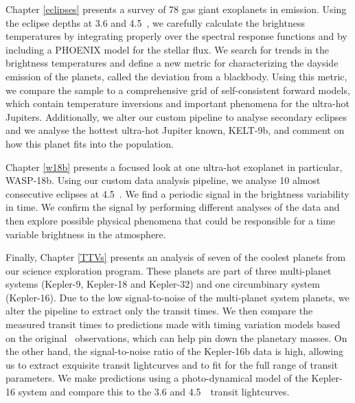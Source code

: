 Chapter \ref{eclipses} presents a survey of 78 gas giant exoplanets in emission. Using the eclipse depths at 3.6 and 4.5~\um, we carefully calculate the brightness temperatures by integrating properly over the \spitzer spectral response functions and by including a PHOENIX model for the stellar flux. We search for trends in the brightness temperatures and define a new metric for characterizing the dayside emission of the planets, called the deviation from a blackbody. Using this metric, we compare the sample to a comprehensive grid of self-consistent forward models, which contain temperature inversions and important phenomena for the ultra-hot Jupiters. Additionally, we alter our custom pipeline to analyse secondary eclipses and we analyse the hottest ultra-hot Jupiter known, KELT-9b, and comment on how this planet fits into the population.

Chapter \ref{w18b} presents a focused look at one ultra-hot exoplanet in particular, WASP-18b. Using our custom data analysis pipeline, we analyse 10 almost consecutive eclipses at 4.5~\um. We find a periodic signal in the brightness variability in time. We confirm the signal by performing different analyses of the data and then explore possible physical phenomena that could be responsible for a time variable brightness in the atmosphere.

Finally, Chapter \ref{TTVs} presents an analysis of seven of the coolest planets from our science exploration program. These planets are part of three multi-planet systems (Kepler-9, Kepler-18 and Kepler-32) and one circumbinary system (Kepler-16). Due to the low signal-to-noise of the multi-planet system planets, we alter the pipeline to extract only the transit times. We then compare the measured transit times to predictions made with timing variation models based on the original \Kepler~observations, which can help pin down the planetary masses. On the other hand, the signal-to-noise ratio of the Kepler-16b data is high, allowing us to extract exquisite transit lightcurves and to fit for the full range of transit parameters. We make predictions using a photo-dynamical model of the Kepler-16 system and compare this to the 3.6 and 4.5~\um~transit lightcurves.

